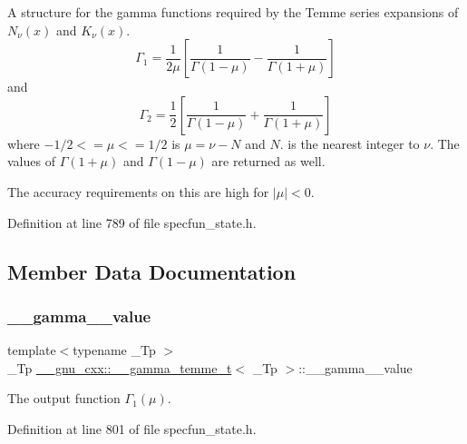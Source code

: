 A structure for the gamma functions required by the Temme series expansions of $ N_\nu(x) $ and $ K_\nu(x) $. \[ \Gamma_1 = \frac{1}{2\mu} \left[\frac{1}{\Gamma(1 - \mu)} - \frac{1}{\Gamma(1 + \mu)}\right] \] and \[ \Gamma_2 = \frac{1}{2} \left[\frac{1}{\Gamma(1 - \mu)} + \frac{1}{\Gamma(1 + \mu)}\right] \] where $ -1/2 <= \mu <= 1/2 $ is $ \mu = \nu - N $ and $ N $. is the nearest integer to $ \nu $. The values of $ \Gamma(1 + \mu) $ and $ \Gamma(1 - \mu) $ are returned as well. 

The accuracy requirements on this are high for $ |\mu| < 0 $. 

Definition at line 789 of file specfun\+\_\+state.\+h.



\subsection{Member Data Documentation}
\mbox{\label{struct____gnu__cxx_1_1____gamma__temme__t_a5cd3cdcf5479d232d3ea118c69198215}} 
\subsubsection{\texorpdfstring{\+\_\+\+\_\+gamma\+\_\+\_\+value}{\_\_gamma\_1\_value}}
{\footnotesize\ttfamily template$<$typename \+\_\+\+Tp $>$ \\
\+\_\+\+Tp \hyperlink{struct____gnu__cxx_1_1____gamma__temme__t}{\+\_\+\+\_\+gnu\+\_\+cxx\+::\+\_\+\+\_\+gamma\+\_\+temme\+\_\+t}$<$ \+\_\+\+Tp $>$\+::\+\_\+\+\_\+gamma\+\_\+\_\+value}



The output function $ \Gamma_1(\mu) $. 



Definition at line 801 of file specfun\+\_\+state.\+h.

\mbox{\label{struct____gnu__cxx_1_1____gamma__temme__t_af3113befce3b6bc9c561472fbaff4520}} 
